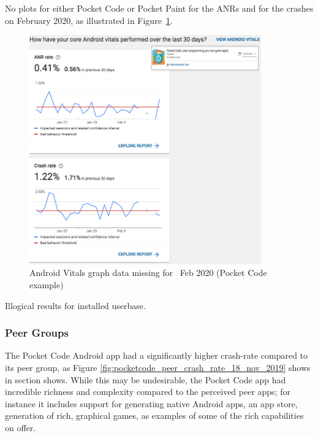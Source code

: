 No plots for either Pocket Code or Pocket Paint for the ANRs and for the crashes on  February 2020, as illustrated in Figure~\ref{fig:android-vitals-pocketcode-broken-graph-10-feb-2020}. 

\begin{figure}
    \centering
    \includegraphics[width=10cm]{images/google-play-console/android-vitals-pocketcode-broken-graph-10-feb-2020.png}
    \caption{Android Vitals graph data missing for~ Feb 2020 (Pocket Code example)}
    \label{fig:android-vitals-pocketcode-broken-graph-10-feb-2020}
\end{figure}
Illogical results for installed userbase. %



\subsubsection{Peer Groups}
The Pocket Code Android app had a significantly higher crash-rate compared to its peer group, as Figure \ref{fig:pocketcode_peer_crash_rate_18_nov_2019} shows in section \href{android-vitals-peer-groups}{\emph{}} shows. While this may be undesirable, the Pocket Code app had incredible richness and complexity compared to the perceived peer apps; for instance it includes support for generating native Android apps, an app store, generation of rich, graphical games, as examples of some of the rich capabilities on offer.



